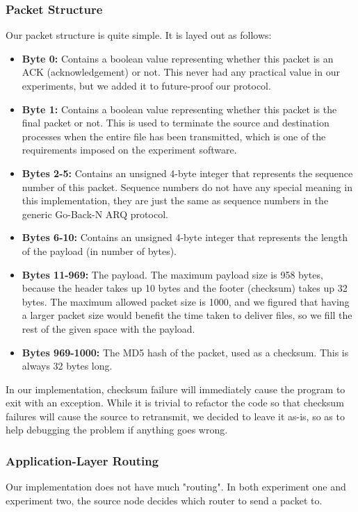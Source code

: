 \documentclass[conference]{IEEEtran}
\begin{document}

\subsubsection{Packet Structure}

Our packet structure is quite simple. It is layed out as follows:

\begin{itemize}
    \item \textbf{Byte 0:} Contains a boolean value representing whether this packet is an ACK
    (acknowledgement) or not. This never had any practical value in our experiments, but we added
    it to future-proof our protocol.
    \item \textbf{Byte 1:} Contains a boolean value representing whether this packet is the final
    packet or not. This is used to terminate the source and destination processes when the entire
    file has been transmitted, which is one of the requirements imposed on the experiment software.
    \item \textbf{Bytes 2-5:} Contains an unsigned 4-byte integer that represents the sequence number
    of this packet. Sequence numbers do not have any special meaning in this implementation, they are
    just the same as sequence numbers in the generic Go-Back-N ARQ protocol.
    \item \textbf{Bytes 6-10:} Contains an unsigned 4-byte integer that represents the length of the
    payload (in number of bytes).
    \item \textbf{Bytes 11-969:} The payload. The maximum payload size is 958 bytes, because the
    header takes up 10 bytes and the footer (checksum) takes up 32 bytes. The maximum allowed packet
    size is 1000, and we figured that having a larger packet size would benefit the time taken to
    deliver files, so we fill the rest of the given space with the payload.
    \item \textbf{Bytes 969-1000:} The MD5 hash of the packet, used as a checksum.
    This is always 32 bytes long.
\end{itemize}

In our implementation, checksum failure will immediately cause the program to exit with an exception.
While it is trivial to refactor the code so that checksum failures will cause the source to retransmit,
we decided to leave it as-is, so as to help debugging the problem if anything goes wrong.

\subsubsection{Application-Layer Routing}
Our implementation does not have much "routing". In both experiment one and experiment two, the
source node decides which router to send a packet to.
\end{document}
